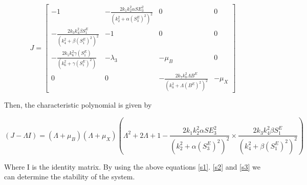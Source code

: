 \begin{equation}
\label{s2}
    J = \begin{bmatrix}
-1 & -\frac{2k_1k_2^2\alpha SE_3^2}{(k_2^2 + \alpha(S_3^E)^2)^2} & 0 & 0 \\
-\frac{2k_3k_4^2\beta S_1^E}{(k_4^2+\beta(S_1^E)^2)^2} & -1 & 0 & 0 \\
-\frac{2k_5k_6^2\gamma(S_1^E)}{(k_6^2+\gamma (S_1^E)^2)} & -\lambda_3 & -\mu_B & 0 \\
0 & 0 & -\frac{2k_7k_8^2\Lambda B^E}{(k_8^2+\Lambda(B^E)^2)^2} & -\mu_X
\end{bmatrix}
\end{equation}

Then, the characteristic polynomial is given by 

\begin{equation}
\label{s3}
    (J - \Lambda I) = (\Lambda + \mu_B)(\Lambda + \mu_X) (\Lambda^2 + 2\Lambda +1 - \frac{2k_1k_2^2\alpha SE_3^2}{(k_2^2 + \alpha(S_3^E)^2)^2} \times \frac{2k_3k_4^2\beta S_1^E}{(k_4^2+\beta(S_1^E)^2)^2})
\end{equation}

Where I is the identity matrix. By using the above equations \eqref{s1}. \eqref{s2} and \eqref{s3} we can determine the stability of the system. 

 


\newpage



